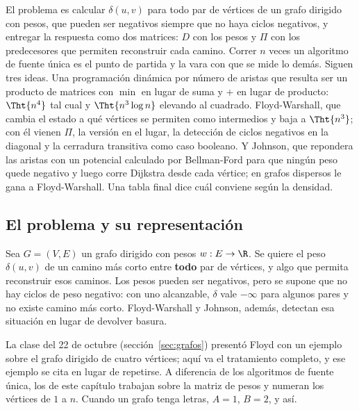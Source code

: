 \documentclass[11pt,letterpaper]{article}
\begin{document}
\newpage


\label{sec:todos-pares}

\begin{quick_sum}
  El problema es calcular $\delta(u, v)$ para todo par de vértices de
  un grafo dirigido con pesos, que pueden ser negativos siempre que no
  haya ciclos negativos, y entregar la respuesta como dos matrices:
  $D$ con los pesos y $\Pi$ con los predecesores que permiten
  reconstruir cada camino. Correr $n$ veces un algoritmo de fuente
  única es el punto de partida y la vara con que se mide lo demás.
  Siguen tres ideas. Una programación dinámica por número de aristas
  que resulta ser un producto de matrices con $\min$ en lugar de suma
  y $+$ en lugar de producto: $\Tht{n^4}$ tal cual y
  $\Tht{n^3 \log n}$ elevando al cuadrado. Floyd-Warshall, que cambia
  el estado a qué vértices se permiten como intermedios y baja a
  $\Tht{n^3}$; con él vienen $\Pi$, la versión en el lugar, la
  detección de ciclos negativos en la diagonal y la cerradura
  transitiva como caso booleano. Y Johnson, que repondera las aristas
  con un potencial calculado por Bellman-Ford para que ningún peso
  quede negativo y luego corre Dijkstra desde cada vértice; en grafos
  dispersos le gana a Floyd-Warshall. Una tabla final dice cuál
  conviene según la densidad.
\end{quick_sum}

\subsection*{El problema y su representación}

Sea $G = (V, E)$ un grafo dirigido con pesos $w : E \to \R$. Se quiere
el peso $\delta(u, v)$ de un camino más corto entre \textbf{todo} par
de vértices, y algo que permita reconstruir esos caminos. Los pesos
pueden ser negativos, pero se supone que no hay ciclos de peso
negativo: con uno alcanzable, $\delta$ vale $-\infty$ para algunos
pares y no existe camino más corto. Floyd-Warshall y Johnson, además,
detectan esa situación en lugar de devolver basura.

La clase del 22 de octubre (sección~\ref{sec:grafos}) presentó Floyd
con un ejemplo sobre el grafo dirigido de cuatro vértices; aquí va el
tratamiento completo, y ese ejemplo se cita en lugar de repetirse. A
diferencia de los algoritmos de fuente única, los de este capítulo
trabajan sobre la matriz de pesos y numeran los vértices de $1$ a $n$.
Cuando un grafo tenga letras, $A = 1$, $B = 2$, y así.
\end{document}
